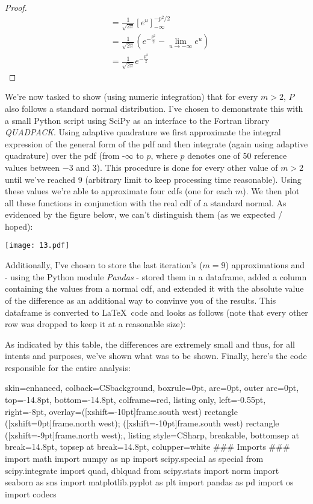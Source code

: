 \documentclass[12pt]{article}
\begin{document}
\begin{enumerate}
\begin{proof}
\begin{align*}
&= \frac{1}{\sqrt{2\pi}} \left[ e^{u} \right]_{-\infty}^{-p^{2}/2} \\
&= \frac{1}{\sqrt{2\pi}} \left( e^{-\frac{p^{2}}{2}} - \lim_{u \to -\infty} e^{u} \right) \\
&= \frac{1}{\sqrt{2\pi}} e^{-\frac{p^{2}}{2}}
\end{align*}
\end{proof}
We're now tasked to show (using numeric integration) that for every $m>2$, $P$ also follows a standard normal distribution. I've chosen to demonstrate this with a small Python script using SciPy as an interface to the Fortran library \textit{QUADPACK}. Using adaptive quadrature we first approximate the integral expression of the general form of the pdf and then integrate (again using adaptive quadrature) over the pdf (from -$\infty$ to $p$, where $p$ denotes one of 50 reference values between $-3$ and $3$). This procedure is done for every other value of $m>2$ until we've reached 9 (arbitrary limit to keep processing time reasonable). Using these values we're able to approximate four cdfs (one for each $m$). We then plot all these functions in conjunction with the real cdf of a standard normal. As evidenced by the figure below, we can't distinguish them (as we expected / hoped):
\begin{center}
\texttt{[image: 13.pdf]}
\end{center}
Additionally, I've chosen to store the last iteration's ($m=9$) approximations and - using the Python module \textit{Pandas} - stored them in a dataframe, added a column containing the values from a normal cdf, and extended it with the absolute value of the difference as an additional way to convinve you of the results. This dataframe is converted to \LaTeX $\,$ code and looks as follows (note that every other row was dropped to keep it at a reasonable size):
\begin{center}
\begin{small}

\end{small}
\end{center}
As indicated by this table, the differences are extremely small and thus, for all intents and purposes, we've shown what was to be shown. Finally, here's the code responsible for the entire analysis: 
\begin{tcblisting}{
    skin=enhanced,
    colback=CSbackground,
    boxrule=0pt,
    arc=0pt,
    outer arc=0pt,
    top=-14.8pt,
    bottom=-14.8pt,
    colframe=red,
    listing only,
    left=-0.55pt,
    right=-8pt,
    overlay={\fill[CSnumberbg] ([xshift=-10pt]frame.south west) rectangle ([xshift=0pt]frame.north west);
    \fill[CSnumberline] ([xshift=-10pt]frame.south west) rectangle ([xshift=-9pt]frame.north west);},
    listing style=CSharp,
    breakable,
    bottomsep at break=14.8pt,
    topsep at break=14.8pt,
    colupper=white
    }
### Imports ###
import math
import numpy as np
import scipy.special as special
from scipy.integrate import quad, dblquad
from scipy.stats import norm
import seaborn as sns
import matplotlib.pyplot as plt
import pandas as pd
import os
import codecs


\end{tcblisting}
\end{enumerate}
\end{document}
